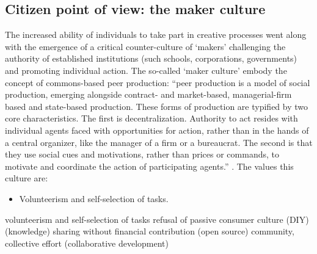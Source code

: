 \documentclass{article}
\begin{document}
\subsection{Citizen point of view: the maker culture}
\label{sec:maker}
The increased ability of individuals to take part in creative processes went along with the emergence of a critical counter-culture of `makers' challenging the authority of established institutions (such schools, corporations, governments) and promoting individual action. The so-called `maker culture' embody the concept of commons-based peer production: ``peer production is a model of social production, emerging alongside contract- and market-based, managerial-firm based and state-based production. These forms of production are typified by two core characteristics. The first is decentralization. Authority to act resides with individual agents faced with opportunities for action, rather than in the hands of a central organizer, like the manager of a firm or a bureaucrat. The second is that they use social cues and motivations, rather than prices or commands, to motivate and coordinate the action of participating agents.'' \cite{benklerCommonsbasedPeerProduction2006}. The values this culture are:
\begin{itemize}
	\item Volunteerism and self-selection of tasks. 
\end{itemize}
volunteerism and self-selection of tasks
refusal of passive consumer culture (DIY)
(knowledge) sharing without financial contribution (open source)
community, collective effort (collaborative development)
\end{document}
